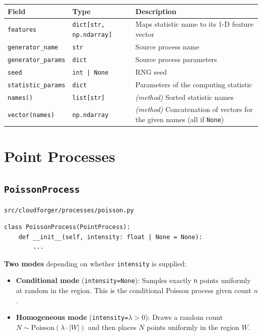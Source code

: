 \documentclass[11pt, a4paper]{article}
\newcommand{\code}[1]{\texttt{#1}}
\newcommand{\pyfile}[1]{\texttt{\small #1}}
\newcommand{\typename}[1]{\textbf{\texttt{#1}}}
\begin{document}
\begin{center}
\begin{tabular}{lll}
\toprule
\textbf{Field} & \textbf{Type} & \textbf{Description} \\
\midrule
\code{features}           & \code{dict[str, np.ndarray]} & Maps statistic name to its 1-D feature vector \\
\code{generator\_name}    & \code{str}                   & Source process name \\
\code{generator\_params}  & \code{dict}                  & Source process parameters \\
\code{seed}               & \code{int | None}            & RNG seed \\
\code{statistic\_params}  & \code{dict}                  & Parameters of the computing statistic \\
\midrule
\code{names()} & \code{list[str]} & \emph{(method)} Sorted statistic names \\
\code{vector(names)} & \code{np.ndarray} & \emph{(method)} Concatenation of vectors for the given names (all if \code{None}) \\
\bottomrule
\end{tabular}
\end{center}

\section{Point Processes}
\label{sec:processes}

\subsection{\typename{PoissonProcess}}
\pyfile{src/cloudforger/processes/poisson.py}

\begin{lstlisting}
class PoissonProcess(PointProcess):
    def __init__(self, intensity: float | None = None):
        ...
\end{lstlisting}

\textbf{Two modes} depending on whether \code{intensity} is supplied:

\begin{itemize}
  \item \textbf{Conditional mode} (\code{intensity=None}):
        Samples exactly \code{n} points uniformly at random in the region.
        This is the conditional Poisson process given count $n$.
  \item \textbf{Homogeneous mode} (\code{intensity=}\(\lambda > 0\)):
        Draws a random count $N \sim \mathrm{Poisson}(\lambda \cdot |W|)$
        and then places $N$ points uniformly in the region $W$.
\end{itemize}
\end{document}
